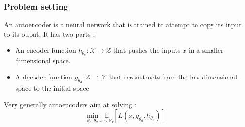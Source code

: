\documentclass[french,9pt]{beamer}
\begin{document}
\begin{frame}
\frametitle{Problem setting}

An autoencoder is a neural network that is trained to attempt to copy its input to its ouput. It has two parts :

\begin{itemize}
\item An encoder function $h_{\theta_{e}} : \mathcal{X} \rightarrow \mathcal{Z}$ that pushes the inputs $x$ in a smaller dimensional space.
\item A decoder function $g_{\theta_{d}} : \mathcal{Z} \rightarrow \mathcal{X}$ that reconstructs from the low dimensional space to the initial space
\end{itemize}

Very generally autoencoders aim at solving  : 
\begin{equation}
\label{autoencodergeneral}
\underset{\theta_{e},\theta_{d}}{\text{min}} \ \underset{x \sim \mathbb{P}_{r}}{\mathbb{E}}[L(x,g_{\theta_{d}},h_{\theta_{e}})]
\end{equation}

\end{frame}

\end{document}
